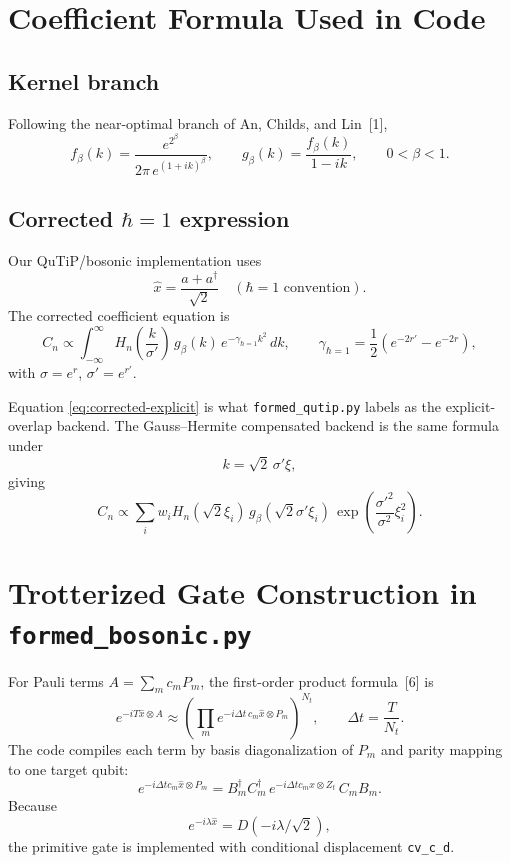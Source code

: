 \documentclass[11pt]{article}
\begin{document}
\section{Coefficient Formula Used in Code}
\subsection{Kernel branch}
Following the near-optimal branch of An, Childs, and Lin~[1],
\begin{equation}
f_\beta(k)=\frac{e^{2^\beta}}{2\pi\,e^{(1+ik)^\beta}},
\qquad
g_\beta(k)=\frac{f_\beta(k)}{1-ik},
\qquad
0<\beta<1.
\end{equation}

\subsection{Corrected $\hbar=1$ expression}
Our QuTiP/bosonic implementation uses
\begin{equation}
\hat{x}=\frac{a+a^\dagger}{\sqrt{2}}
\quad (\hbar=1\text{ convention}).
\end{equation}
The corrected coefficient equation is
\begin{equation}
C_n \propto \int_{-\infty}^{\infty}
H_n\!\left(\frac{k}{\sigma'}\right)
\,g_\beta(k)
\,e^{-\gamma_{\hbar=1}k^2}
\,dk,
\qquad
\gamma_{\hbar=1}=\frac12\left(e^{-2r'}-e^{-2r}\right),
\label{eq:corrected-explicit}
\end{equation}
with $\sigma=e^r$, $\sigma'=e^{r'}$.

Equation \eqref{eq:corrected-explicit} is what \texttt{formed\_qutip.py} labels as the explicit-overlap backend.
The Gauss--Hermite compensated backend is the same formula under
\begin{equation}
k=\sqrt{2}\,\sigma'\xi,
\end{equation}
giving
\begin{equation}
C_n \propto \sum_i w_i
H_n(\sqrt{2}\xi_i)
\,g_\beta(\sqrt{2}\sigma'\xi_i)
\,\exp\!\left(\frac{\sigma'^2}{\sigma^2}\xi_i^2\right).
\label{eq:gh-comp}
\end{equation}

\section{Trotterized Gate Construction in \texttt{formed\_bosonic.py}}
For Pauli terms $A=\sum_m c_mP_m$, the first-order product formula~[6] is
\begin{equation}
e^{-iT\hat{x}\otimes A}
\approx
\left(\prod_m e^{-i\Delta t\,c_m\hat{x}\otimes P_m}\right)^{N_t},
\qquad
\Delta t=\frac{T}{N_t}.
\end{equation}
The code compiles each term by basis diagonalization of $P_m$ and parity mapping to one target qubit:
\begin{equation}
e^{-i\Delta t c_m\hat{x}\otimes P_m}
=
B_m^\dagger C_m^\dagger
\,e^{-i\Delta t c_m\hat{x}\otimes Z_t}
\,C_mB_m.
\end{equation}
Because
\begin{equation}
e^{-i\lambda\hat{x}}=D\!\left(-i\lambda/\sqrt{2}\right),
\end{equation}
the primitive gate is implemented with conditional displacement \texttt{cv\_c\_d}.
\end{document}
